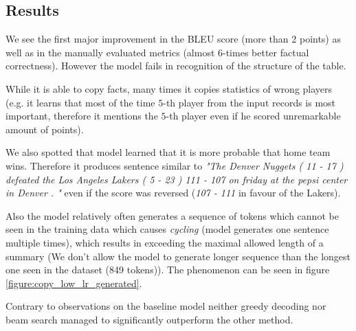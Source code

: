 \subsection{Results}

We see the first major improvement in the BLEU score (more than 2 points) as well as in the manually evaluated metrics (almost $6$-times better factual correctness). However the model fails in recognition of the structure of the table.

While it is able to copy facts, many times it copies statistics of wrong players (e.g. it learns that most of the time $5$-th player from the input records is most important, therefore it mentions the $5$-th player even if he scored unremarkable amount of points).

We also spotted that model learned that it is more probable that home team wins. Therefore it produces sentence similar to \emph{"The Denver Nuggets ( 11 - 17 ) defeated the Los Angeles Lakers ( 5 - 23 ) 111 - 107 on friday at the pepsi center in Denver . "} even if the score was reversed (\emph{107 - 111} in favour of the Lakers).

Also the model relatively often generates a sequence of tokens which cannot be seen in the training data which causes \emph{cycling} (model generates one sentence multiple times), which results in exceeding the maximal allowed length of a summary (We don't allow the model to generate longer sequence than the longest one seen in the dataset (849 tokens)). The phenomenon can be seen in figure \ref{figure:copy_low_lr_generated}.

Contrary to observations on the baseline model neither greedy decoding nor beam search managed to significantly outperform the other method.

\begin{table}[h]
    \centering
    \caption{Performance metrics on the joint-copy models.} \label{table:metrics_copy_low_lr}
\end{table}

